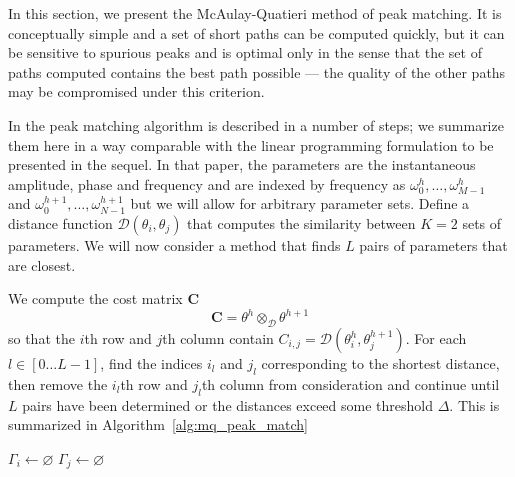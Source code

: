 In this section, we present the McAulay-Quatieri method of peak matching. It is
conceptually simple and a set of short paths can be computed quickly, but
it can be sensitive to spurious peaks and is optimal only in the sense that
the set of paths computed contains the best path possible --- the quality of the
other paths may be compromised under this criterion.

In \cite[p.~748]{mcaulay1986speech} the peak matching algorithm is described in
a number of steps; we summarize them here in a way comparable with the linear
programming formulation to be presented in the sequel. In that paper, the
parameters are the instantaneous amplitude, phase and frequency and are indexed
by frequency as $\omega_0^{h}, \dotsc, \omega_{M-1}^{h}$ and $\omega_0^{h+1},
\dotsc, \omega_{N-1}^{h+1}$ but we will allow for arbitrary parameter sets.
Define a distance function $\mathcal{D} \left( \theta_{i},\theta_{j} \right)$
that computes the similarity between $K=2$ sets of parameters. We will now
consider a method that finds $L$ pairs of parameters that are closest.

We compute the cost matrix $\boldsymbol{C}$
\[
    \boldsymbol{C} = \theta^{h} \otimes_{\mathcal{D}} \theta^{h+1}
\]
so that the $i$th row and $j$th column contain $C_{i,j} = \mathcal{D} \left(
\theta_{i}^{h},\theta_{j}^{h+1} \right)$.  For each $l \in \left[0 \dotsc L-1
\right]$, find the indices $i_{l}$ and $j_{l}$ corresponding to the shortest
distance, then remove the $i_{l}$th row and $j_{l}$th column from consideration
and continue until $L$ pairs have been determined or the distances exceed some
threshold $\Delta$. This is summarized in Algorithm~\ref{alg:mq_peak_match}

\begin{algorithm}[H]
    \caption{\label{alg:mq_peak_match}}
    $\Gamma_{i} \leftarrow \varnothing$\;
    $\Gamma_{j} \leftarrow \varnothing$\;
\end{algorithm}

